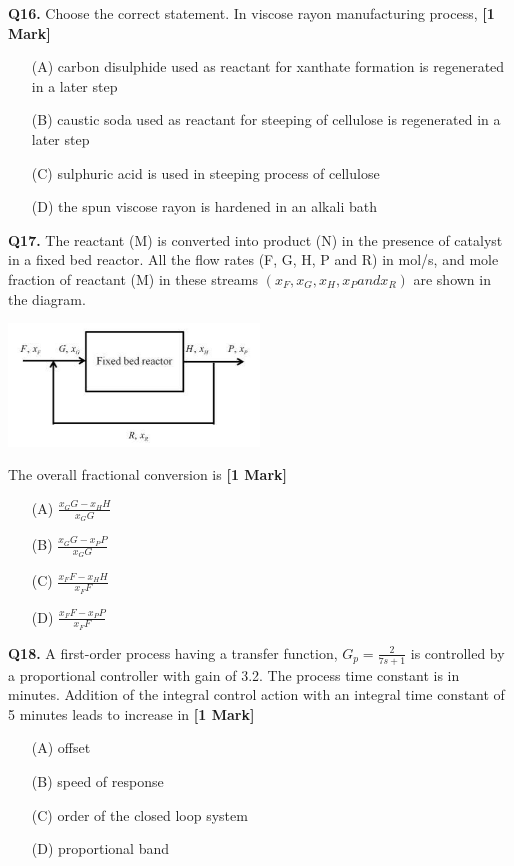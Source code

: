 \documentclass[11pt]{article}
\newcommand{\questiona}[2]{
    \noindent\textbf{Q#2.} #1 \hfill \textbf{[1 Mark]}
}
\begin{document}
\questiona{Choose the correct statement. In viscose rayon manufacturing process,}{16}
\begin{enumerate}
    \item[(A)] carbon disulphide used as reactant for xanthate formation is regenerated in a later step  
    \item[(B)] caustic soda used as reactant for steeping of cellulose is regenerated in a later step  
    \item[(C)] sulphuric acid is used in steeping process of cellulose  
    \item[(D)] the spun viscose rayon is hardened in an alkali bath  
\end{enumerate}

\questiona{The reactant (M) is converted into product (N) in the presence of catalyst in a fixed bed reactor. All the flow rates (F, G, H, P and R) in mol/s, and mole fraction of reactant (M) in these streams $(x_F, x_G, x_H, x_P and x_R)$ are shown in the diagram.
\begin{center}
\includegraphics[width=0.5\textwidth]{figures/Q17.png}
\end{center}
The overall fractional conversion is}{17}
\begin{enumerate}
    \item[(A)] \(\frac{x_G G - x_H H}{x_G G}\)  
    \item[(B)] \(\frac{x_G G - x_P P}{x_G G}\)  
    \item[(C)] \(\frac{x_F F - x_H H}{x_F F}\)  
    \item[(D)] \(\frac{x_F F - x_P P}{x_F F}\)  
\end{enumerate}

\questiona{A first-order process having a transfer function, \(G_p = \frac{2}{7s + 1}\) is controlled by a proportional controller with gain of 3.2. The process time constant is in minutes. Addition of the integral control action with an integral time constant of 5 minutes leads to increase in}{18}
\begin{enumerate}
    \item[(A)] offset  
    \item[(B)] speed of response  
    \item[(C)] order of the closed loop system  
    \item[(D)] proportional band  
\end{enumerate}
\end{document}
